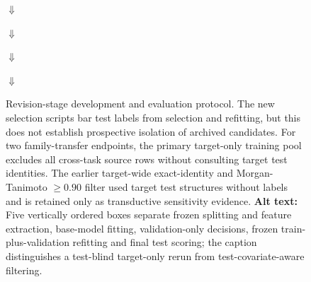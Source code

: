\documentclass[10pt]{article}
\begin{document}
\begin{figure}[htbp]
\centering
\setlength{\fboxsep}{7pt}
\begin{minipage}{0.96\textwidth}
\centering
{}

$\Downarrow$


$\Downarrow$


$\Downarrow$


$\Downarrow$

\end{minipage}
\caption{Revision-stage development and evaluation protocol. The new selection scripts bar test labels from selection and refitting, but this does not establish prospective isolation of archived candidates. For two family-transfer endpoints, the primary target-only training pool excludes all cross-task source rows without consulting target test identities. The earlier target-wide exact-identity and Morgan-Tanimoto $\geq 0.90$ filter used target test structures without labels and is retained only as transductive sensitivity evidence. \textbf{Alt text:} Five vertically ordered boxes separate frozen splitting and feature extraction, base-model fitting, validation-only decisions, frozen train-plus-validation refitting and final test scoring; the caption distinguishes a test-blind target-only rerun from test-covariate-aware filtering.}
\label{fig:supp_protocol}
\end{figure}
\end{document}
